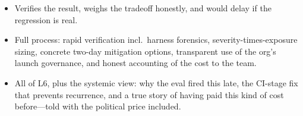 \begin{interviewq}

\goodgreat
\begin{itemize}
    \item {} Verifies the result, weighs the tradeoff honestly, and would delay if the regression is real.
    \item {} Full process: rapid verification incl.\ harness forensics, severity-times-exposure sizing, concrete two-day mitigation options, transparent use of the org's launch governance, and honest accounting of the cost to the team.
    \item {} All of L6, plus the systemic view: why the eval fired this late, the CI-stage fix that prevents recurrence, and a true story of having paid this kind of cost before---told with the political price included.
\end{itemize}

\end{interviewq}


